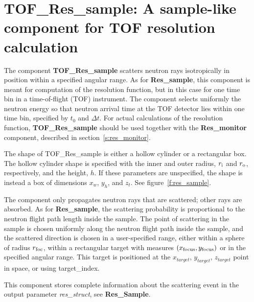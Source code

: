 
\section{TOF\_Res\_sample: A sample-like component for TOF resolution calculation}
\label{s:tof_res_sample}


The component \textbf{TOF\_Res\_sample} scatters neutron rays isotropically
in position within a specified angular range. 
As for {\bf Res\_sample}, this component is meant
for computation of the resolution function, but in this case for one time bin in a
time-of-flight (TOF) instrument. The component selects uniformly the neutron 
energy so that neutron arrival time at the TOF detector lies within one time bin,
specified by $t_0$ and $\Delta t$.
For actual calculations of the resolution
function, {\bf TOF\_Res\_sample} should be used
together with the \textbf{Res\_monitor} component, described in
section~\ref{s:res_monitor}.

The shape of {\rm TOF\_Res\_sample} is either a hollow cylinder
or a rectangular box. 
The hollow cylinder shape is
specified with the inner and outer radius, $r_{\rm i}$ and $r_{\rm o}$,
respectively, and the height, $h$.
If these parameters are unspecified,
the shape is instead a box of dimensions $x_w$, $y_h$, and $z_t$.
See figure~\ref{f:res_sample}.\par

The component only propagates neutron rays that are scattered; 
other rays are absorbed. 
As for {\bf Res\_sample}, the scattering probability is proportional to the neutron
flight path length inside the sample.
The point of scattering in the sample is chosen uniformly
along the neutron flight path inside the sample, and the scattered
direction is chosen in a user-specified range,
either within a sphere of radius $r_{\rm foc}$, within a rectangular
target with measures $(x_{\rm focus}, y_{\rm focus})$
or in the specified angular range. 
This target is positioned at the $x_{target}$, $y_{target}$, $z_{target}$ 
point in space, or using target\_index.

This component stores complete information about the scattering event in the
output parameter \textit{res\_struct}, see {\bf Res\_Sample}. 
